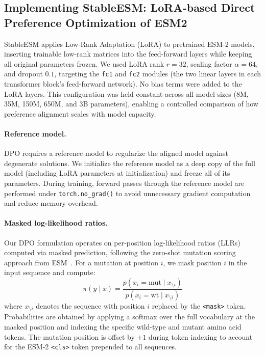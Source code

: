 \subsection{Implementing StableESM: LoRA-based Direct Preference Optimization of ESM2}\label{sec:stableesm_implementation}

StableESM applies Low-Rank Adaptation (LoRA) to pretrained ESM-2 models, inserting trainable low-rank matrices into the feed-forward layers while keeping all original parameters frozen.
We used LoRA rank $r = 32$, scaling factor $\alpha = 64$, and dropout $0.1$, targeting the \texttt{fc1} and \texttt{fc2} modules (the two linear layers in each transformer block's feed-forward network).
No bias terms were added to the LoRA layers.
This configuration was held constant across all model sizes (8M, 35M, 150M, 650M, and 3B parameters), enabling a controlled comparison of how preference alignment scales with model capacity.

\paragraph{Reference model.}
DPO requires a reference model to regularize the aligned model against degenerate solutions.
We initialize the reference model as a deep copy of the full model (including LoRA parameters at initialization) and freeze all of its parameters.
During training, forward passes through the reference model are performed under \texttt{torch.no\_grad()} to avoid unnecessary gradient computation and reduce memory overhead.

\paragraph{Masked log-likelihood ratios.}
Our DPO formulation operates on per-position log-likelihood ratios (LLRs) computed via masked prediction, following the zero-shot mutation scoring approach from ESM~\citep{meier2021language}.
For a mutation at position $i$, we mask position $i$ in the input sequence and compute:
\begin{equation}
\pi(y \mid x) = \frac{p(x_i = \text{mut} \mid x_{\setminus i})}{p(x_i = \text{wt} \mid x_{\setminus i})}
\end{equation}
where $x_{\setminus i}$ denotes the sequence with position $i$ replaced by the \texttt{<mask>} token.
Probabilities are obtained by applying a softmax over the full vocabulary at the masked position and indexing the specific wild-type and mutant amino acid tokens.
The mutation position is offset by $+1$ during token indexing to account for the ESM-2 \texttt{<cls>} token prepended to all sequences.

